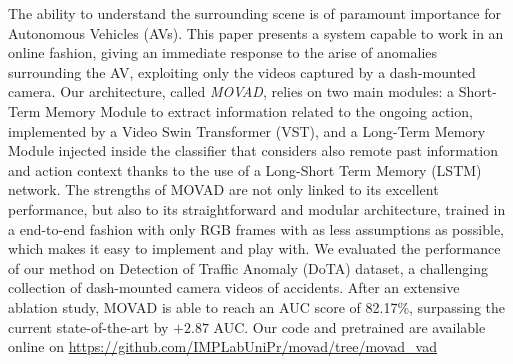 The ability to understand the surrounding scene is of paramount importance for Autonomous Vehicles (AVs).
This paper presents a system capable to work in an online fashion, giving an immediate response to the arise of anomalies surrounding the AV, exploiting only the videos captured by a dash-mounted camera.
Our architecture, called \emph{MOVAD}, relies on two main modules: a Short-Term Memory Module to extract information related to the ongoing action, implemented by a Video Swin Transformer (VST), and a Long-Term Memory Module injected inside the classifier that considers also remote past information and action context thanks to the use of a Long-Short Term Memory (LSTM) network. 
The strengths of MOVAD are not only linked to its excellent performance, but also to its straightforward and modular architecture, trained in a end-to-end fashion with only RGB frames with as less assumptions as possible, which makes it easy to implement and play with.
We evaluated the performance of our method on Detection of Traffic Anomaly (DoTA) dataset, a challenging collection of dash-mounted camera videos of accidents.
After an extensive ablation study, MOVAD is able to reach an AUC score of 82.17\%, surpassing the current state-of-the-art by $+2.87$ AUC.
Our code and pretrained are available online on {\footnotesize \url{https://github.com/IMPLabUniPr/movad/tree/movad_vad}}